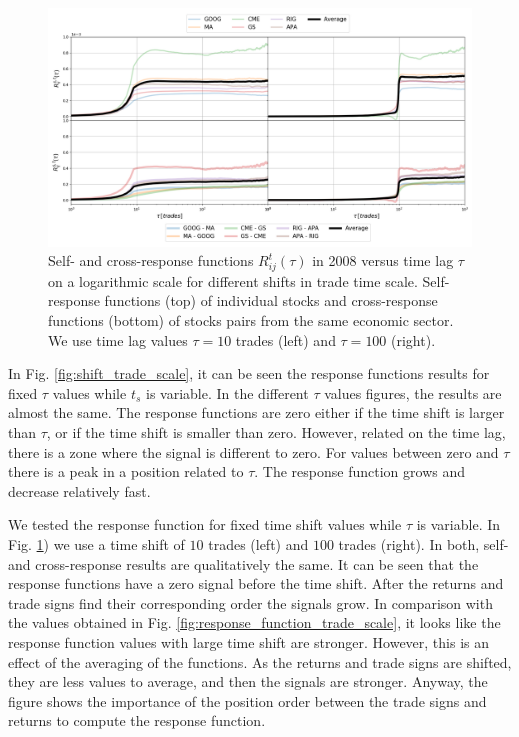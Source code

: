 \begin{figure}[htbp]
    \centering
    \includegraphics[width=\textwidth]{figures/04_shift_responses_trade.png}
    \caption{Self- and cross-response functions $R^{t}_{ij}\left(\tau\right)$
             in 2008 versus time lag $\tau$ on a logarithmic scale for
             different shifts in trade time scale. Self-response functions
             (top) of individual stocks and cross-response functions (bottom)
             of stocks pairs from the same economic sector. We use time lag
             values $\tau=10$ trades (left) and $\tau=100$ (right).}
    \label{fig:shift_responses_trade_scale}
\end{figure}

In Fig. \ref{fig:shift_trade_scale}, it can be seen the response functions
results for fixed $\tau$ values while $t_{s}$ is variable. In the different
$\tau$ values figures, the results are almost the same. The response functions
are zero either if the time shift is larger than $\tau$, or if the time shift
is smaller than zero. However, related on the time lag, there is a zone where
the signal is different to zero. For values between zero and $\tau$ there is a
peak in a position related to $\tau$. The response function grows and decrease
relatively fast.

We tested the response function for fixed time shift values while $\tau$ is
variable. In Fig. \ref{fig:shift_responses_trade_scale}) we use a time shift of
$10$ trades (left) and $100$ trades (right). In both, self- and cross-response
results are qualitatively the same. It can be seen that the response functions
have a zero signal before the time shift. After the returns and trade signs
find their corresponding order the signals grow. In comparison with the values
obtained in Fig. \ref{fig:response_function_trade_scale}, it looks like the
response function values with large time shift are stronger. However, this is
an effect of the averaging of the functions. As the returns and trade signs are
shifted, they are less values to average, and then the signals are stronger.
Anyway, the figure shows the importance of the position order between the trade
signs and returns to compute the response function.


